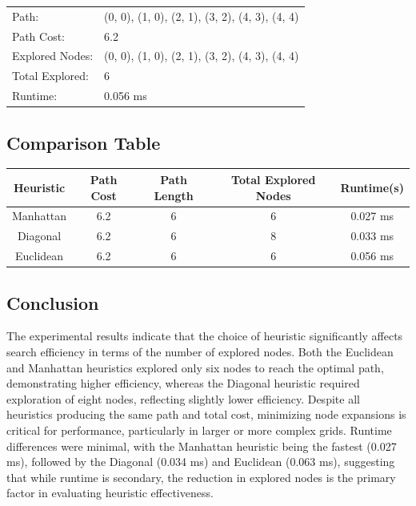 \documentclass[14pt]{extarticle}
\begin{document}
\begin{tabularx}{\linewidth}{lX}
   Path: & (0, 0), (1, 0), (2, 1), (3, 2), (4, 3), (4, 4) \\
   Path Cost: & 6.2 \\
   Explored Nodes: & (0, 0), (1, 0), (2, 1), (3, 2), (4, 3), (4, 4) \\
   Total Explored: & 6 \\
   Runtime: & 0.056 ms \\
\end{tabularx}



\vspace{1em}
\subsection*{Comparison Table}
\begin{center}
\begin{tabularx}{\linewidth}{|C|C|C|C|C|}\hline
   \textbf{Heuristic} & \textbf{Path Cost} & \textbf{Path Length} &
   \textbf{Total Explored Nodes} & \textbf{Runtime(s)} \\\hline

   Manhattan & 6.2 & 6 & 6 & 0.027 ms
   \\\hline
   Diagonal & 6.2 & 6 & 8 & 0.033 ms
   \\\hline
   Euclidean & 6.2 & 6 & 6 & 0.056 ms
   \\\hline
\end{tabularx}
\end{center}


\vspace{1em}
\subsection*{Conclusion}

The experimental results indicate that the choice of heuristic significantly affects search efficiency in terms of the number of explored nodes. Both the Euclidean and Manhattan heuristics explored only six nodes to reach the optimal path, demonstrating higher efficiency, whereas the Diagonal heuristic required exploration of eight nodes, reflecting slightly lower efficiency. Despite all heuristics producing the same path and total cost, minimizing node expansions is critical for performance, particularly in larger or more complex grids. Runtime differences were minimal, with the Manhattan heuristic being the fastest (0.027 ms), followed by the Diagonal (0.034 ms) and Euclidean (0.063 ms), suggesting that while runtime is secondary, the reduction in explored nodes is the primary factor in evaluating heuristic effectiveness.
\end{document}
